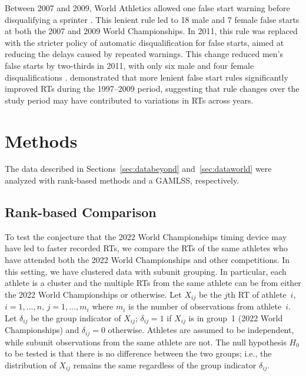\documentclass[12pt, letterpaper]{article}
\begin{document}
Between 2007 and 2009, World Athletics allowed one
false start warning before disqualifying a sprinter \citep{iaaf2009falsestart}.
This lenient rule led to 18 male and 7 female false starts at both the 2007
and 2009 World Championships. In 2011, this rule was replaced with the stricter
policy of automatic disqualification for false starts, aimed at reducing the
delays caused by repeated warnings. This change reduced men’s false starts
by two-thirds in 2011, with only six male and four female disqualifications
\citep{iaaf2009falsestart}. \citet{haugen2013effect} demonstrated that more
lenient false start rules significantly improved RTs during the
1997–2009 period, suggesting that rule changes over the study period may
have contributed to variations in RTs across years.


\section{Methods} \label{sec:methods}

The data described in Sections~\ref{sec:databeyond} and~\ref{sec:dataworld} were
analyzed with rank-based methods and a GAMLSS, respectively.


\subsection{Rank-based Comparison}\label{sec:rank}


To test the conjecture that the 2022 World Championships timing device may have
led to faster recorded RTs, we compare the RTs of the same
athletes who have attended both the 2022 World Championships and other
competitions.
In this setting, we have clustered data with subunit grouping. In particular,
each athlete is a cluster and the multiple RTs from the same athlete
can be from either the 2022 World Championships or otherwise.
Let $X_{ij}$ be the $j$th RT of athlete~$i$, $i = 1, \ldots, n$,
$j = 1, \ldots, m_i$ where $m_i$ is the number of observations from
athlete~$i$. Let $\delta_{ij}$ be the group indicator of $X_{ij}$; $\delta_{ij}
= 1$ if $X_{ij}$ is in group~1 (2022 World Championships) and $\delta_{ij} = 0$
otherwise. Athletes are
assumed to be independent, while subunit observations from the same athlete are
not. The null hypothesis $H_0$ to be tested is that there is no difference
between the two groups; i.e., the distribution of $X_{ij}$ remains the same
regardless of the group indicator $\delta_{ij}$.
\end{document}
